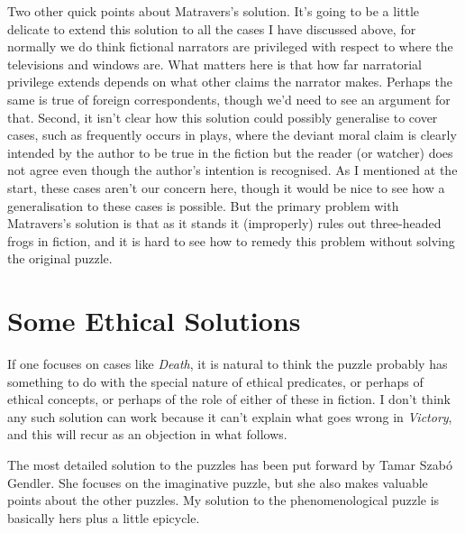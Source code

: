 \documentclass[
  11pt,
  letterpaper,
  DIV=11,
  numbers=noendperiod,
  twoside]{scrartcl}
\begin{document}
Two other quick points about Matravers's solution. It's going to be a
little delicate to extend this solution to all the cases I have
discussed above, for normally we do think fictional narrators are
privileged with respect to where the televisions and windows are. What
matters here is that how far narratorial privilege extends depends on
what other claims the narrator makes. Perhaps the same is true of
foreign correspondents, though we'd need to see an argument for that.
Second, it isn't clear how this solution could possibly generalise to
cover cases, such as frequently occurs in plays, where the deviant moral
claim is clearly intended by the author to be true in the fiction but
the reader (or watcher) does not agree even though the author's
intention is recognised. As I mentioned at the start, these cases aren't
our concern here, though it would be nice to see how a generalisation to
these cases is possible. But the primary problem with Matravers's
solution is that as it stands it (improperly) rules out three-headed
frogs in fiction, and it is hard to see how to remedy this problem
without solving the original puzzle.

\section{Some Ethical Solutions}\label{some-ethical-solutions}

If one focuses on cases like \emph{Death}, it is natural to think the
puzzle probably has something to do with the special nature of ethical
predicates, or perhaps of ethical concepts, or perhaps of the role of
either of these in fiction. I don't think any such solution can work
because it can't explain what goes wrong in \emph{Victory}, and this
will recur as an objection in what follows.

The most detailed solution to the puzzles has been put forward by Tamar
Szabó Gendler. She focuses on the imaginative puzzle, but she also makes
valuable points about the other puzzles. My solution to the
phenomenological puzzle is basically hers plus a little epicycle.
\end{document}

